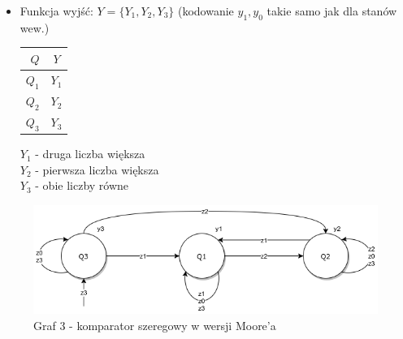 \documentclass[12pt,a4paper]{article}
\begin{document}
\begin{itemize}
			\item Funkcja wyjść: \(Y=\{Y_1, Y_2, Y_3\}\) (kodowanie \(y_1,y_0\) takie samo jak dla stanów wew.)\\
			
			\begin{minipage}{{.5\textwidth}}
				\centering
				\begin{tabular}{r|c}
					\(Q\)	&	\(Y\)	\\\hline
					\(Q_1\)	&	\(Y_1\)	\\
					\(Q_2\)	&	\(Y_2\)	\\
					\(Q_3\)	&	\(Y_3\)	\\
				\end{tabular}
			\end{minipage}%
			\begin{minipage}{{.5\textwidth}}	
				\(Y_1\) - druga liczba większa\\
				\(Y_2\) - pierwsza liczba większa\\
				\(Y_3\) - obie liczby równe\\
			\end{minipage}
		\end{itemize}\vspace{1.5cm}
		
		\begin{figure}[H]
			\centering
			\includegraphics[width=.75\textwidth]{schem/diag3.png}
			\\
			\vspace{.1cm}
				Graf 3 - komparator szeregowy w wersji Moore'a
		\end{figure}
	
		
\end{document}
